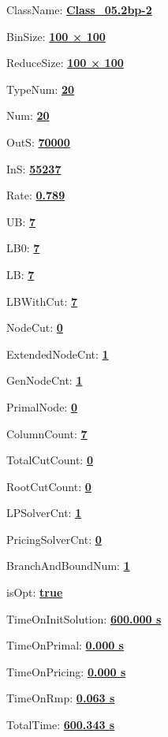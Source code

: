 \documentclass[11pt]{article}
\begin{document}
\pagestyle{empty}


ClassName: \underline{\textbf{Class_05.2bp-2}}
\par
BinSize: \underline{\textbf{100 × 100}}
\par
ReduceSize: \underline{\textbf{100 × 100}}
\par
TypeNum: \underline{\textbf{20}}
\par
Num: \underline{\textbf{20}}
\par
OutS: \underline{\textbf{70000}}
\par
InS: \underline{\textbf{55237}}
\par
Rate: \underline{\textbf{0.789}}
\par
UB: \underline{\textbf{7}}
\par
LB0: \underline{\textbf{7}}
\par
LB: \underline{\textbf{7}}
\par
LBWithCut: \underline{\textbf{7}}
\par
NodeCut: \underline{\textbf{0}}
\par
ExtendedNodeCnt: \underline{\textbf{1}}
\par
GenNodeCnt: \underline{\textbf{1}}
\par
PrimalNode: \underline{\textbf{0}}
\par
ColumnCount: \underline{\textbf{7}}
\par
TotalCutCount: \underline{\textbf{0}}
\par
RootCutCount: \underline{\textbf{0}}
\par
LPSolverCnt: \underline{\textbf{1}}
\par
PricingSolverCnt: \underline{\textbf{0}}
\par
BranchAndBoundNum: \underline{\textbf{1}}
\par
isOpt: \underline{\textbf{true}}
\par
TimeOnInitSolution: \underline{\textbf{600.000 s}}
\par
TimeOnPrimal: \underline{\textbf{0.000 s}}
\par
TimeOnPricing: \underline{\textbf{0.000 s}}
\par
TimeOnRmp: \underline{\textbf{0.063 s}}
\par
TotalTime: \underline{\textbf{600.343 s}}
\par
\newpage


\end{document}
